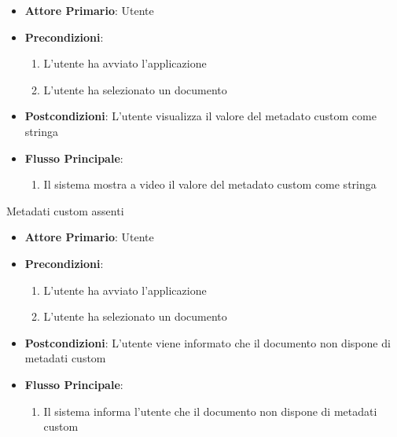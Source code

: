 \begin{itemize}
    \item \textbf{Attore Primario}: Utente
        \item \textbf{Precondizioni}:
        \begin{enumerate}
            \item L'utente ha avviato l'applicazione
            \item L'utente ha selezionato un documento
        \end{enumerate}
        \item \textbf{Postcondizioni}: L'utente visualizza il valore del metadato custom come stringa
        \item \textbf{Flusso Principale}: 
        \begin{enumerate}
            \item Il sistema mostra a video il valore del metadato custom come stringa
        \end{enumerate}
\end{itemize}

 {Metadati custom assenti}
\begin{itemize}
    \item \textbf{Attore Primario}: Utente
    \item \textbf{Precondizioni}:
    \begin{enumerate}
        \item L'utente ha avviato l'applicazione
        \item L'utente ha selezionato un documento
    \end{enumerate}
    \item \textbf{Postcondizioni}: L'utente viene informato che il documento non dispone di metadati custom
    \item \textbf{Flusso Principale}: 
    \begin{enumerate}
        \item Il sistema informa l'utente che il documento non dispone di metadati custom
    \end{enumerate}
\end{itemize}
